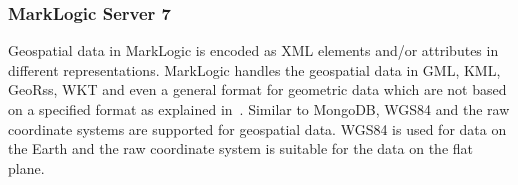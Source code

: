 \documentclass[a4paper,12pt]{article}
\begin{document}

\subsubsection{MarkLogic Server 7}
Geospatial data in MarkLogic is encoded as XML elements and/or attributes in different representations. MarkLogic handles the geospatial data in GML, KML, GeoRss, WKT and even a general format for geometric data which are not based on a specified format as explained in~\cite{marklogicGeo}. Similar to MongoDB, WGS84 and the raw coordinate systems are supported for geospatial data. WGS84 is used for data on the Earth and the raw coordinate system is suitable for the data on the flat plane.
\end{document}
